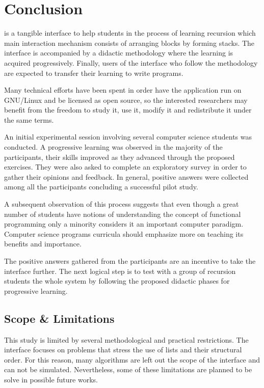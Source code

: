 
\section{Conclusion}

\vestige is a tangible interface to help students in the process of
learning recursion which main interaction mechanism consists of
arranging blocks by forming stacks. The interface is accompanied by a
didactic methodology where the learning is acquired progressively.
Finally, users of the interface who follow the methodology are
expected to transfer their learning to write \erlang programs.

Many technical efforts have been spent in order have the application
run on \textsf{GNU/Linux} and be licensed as open source, so the
interested researchers may benefit from the freedom to study it, use
it, modify it and redistribute it under the same terms.

An initial experimental session involving several computer science
students was conducted. A progressive learning was observed in the
majority of the participants, their skills improved as they advanced
through the proposed exercises. They were also asked to complete
an exploratory survey in order to gather their opinions and feedback.
In general, positive answers were collected among all the
participants concluding a successful pilot study.

A subsequent observation of this process suggests that even though
a great number of students have notions of understanding the
concept of functional programming only a minority considers it an
important computer paradigm. Computer science programs curricula
should emphasize more on teaching its benefits and importance.

The positive answers gathered from the participants are an incentive
to take the interface further. The next logical step is to test
with a group of recursion students the whole system by following the
proposed didactic phases for progressive learning.

\subsection{Scope \& Limitations}

This study is limited by several methodological and practical
restrictions. The interface focuses on problems that stress the use of
lists and their structural order. For this reason, many algorithms are
left out the scope of the interface and can not be simulated.
Nevertheless, some of these limitations are planned to be solve in
possible future works.

